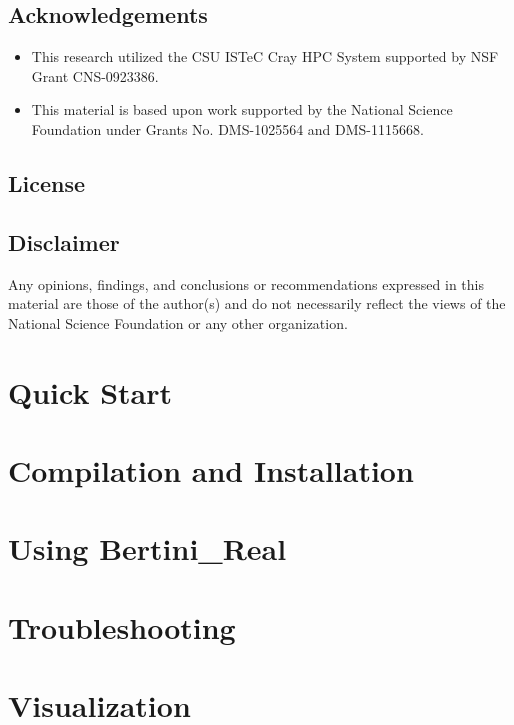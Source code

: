 \documentclass[10pt]{article}
\begin{document}
\subsection*{Acknowledgements}
\begin{itemize}
\item  This research utilized the CSU ISTeC Cray HPC System supported by NSF Grant CNS-0923386.
\item  This material is based upon work supported by the National Science Foundation under Grants No. DMS-1025564 and DMS-1115668.
\end{itemize}

\subsection{License}
\label{sec:license}

\subsection*{Disclaimer}

Any opinions, findings, and conclusions or recommendations expressed in this material are those of the author(s) and do not necessarily reflect the views of the National Science Foundation or any other organization.




\clearpage
\section{Quick Start}
\label{sec:started}

\section{Compilation and Installation}



\clearpage
\section{Using Bertini\_Real}
\label{sec:running}

\section{Troubleshooting}

\section{Visualization}
\end{document}
